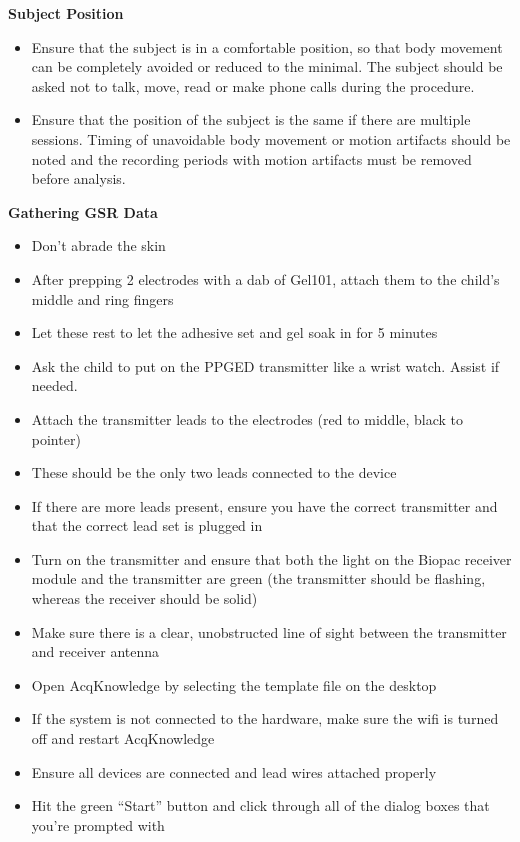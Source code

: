 \documentclass[]{book}
\providecommand{\tightlist}{%
  \setlength{\itemsep}{0pt}\setlength{\parskip}{0pt}}
\begin{document}
\textbf{Subject Position}

\begin{itemize}
\tightlist
\item
  Ensure that the subject is in a comfortable position, so that body
  movement can be completely avoided or reduced to the minimal. The
  subject should be asked not to talk, move, read or make phone calls
  during the procedure.
\item
  Ensure that the position of the subject is the same if there are
  multiple sessions. Timing of unavoidable body movement or motion
  artifacts should be noted and the recording periods with motion
  artifacts must be removed before analysis.
\end{itemize}

\textbf{Gathering GSR Data}

\begin{itemize}
\tightlist
\item
  Don't abrade the skin
\item
  After prepping 2 electrodes with a dab of Gel101, attach them to the
  child's middle and ring fingers
\item
  Let these rest to let the adhesive set and gel soak in for 5 minutes
\item
  Ask the child to put on the PPGED transmitter like a wrist watch.
  Assist if needed.
\item
  Attach the transmitter leads to the electrodes (red to middle, black
  to pointer)
\item
  These should be the only two leads connected to the device
\item
  If there are more leads present, ensure you have the correct
  transmitter and that the correct lead set is plugged in
\item
  Turn on the transmitter and ensure that both the light on the Biopac
  receiver module and the transmitter are green (the transmitter should
  be flashing, whereas the receiver should be solid)
\item
  Make sure there is a clear, unobstructed line of sight between the
  transmitter and receiver antenna
\item
  Open AcqKnowledge by selecting the template file on the desktop
\item
  If the system is not connected to the hardware, make sure the wifi is
  turned off and restart AcqKnowledge
\item
  Ensure all devices are connected and lead wires attached properly
\item
  Hit the green ``Start'' button and click through all of the dialog
  boxes that you're prompted with
\end{itemize}
\end{document}
